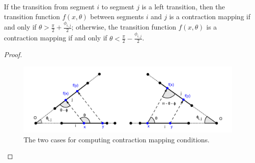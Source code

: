 \documentclass[]{styles/svproc}  %
\begin{document}
\begin{lemma} \label{lemma:angrange}
If the transition from segment $i$ to segment $j$ is a left transition, then the
transition function $f(x, \theta)$ between segments $i$ and $j$ is a contraction
mapping if and only if $\theta > \frac{\pi}{2}+\frac{\phi_{i, j}}{2}$;
otherwise, the transition function $f(x, \theta)$ is a contraction mapping if
and only if $\theta < \frac{\pi}{2}-\frac{\phi_{i, j}}{2}$.
\end{lemma}
\begin{proof}

\begin{figure}
    \includegraphics[width=1\linewidth]{figures/contraction_map_cond.png}
    \centering
    \caption{The two cases for computing contraction mapping conditions. \label{fig:cont_map}}
    \centering
\end{figure}


\end{proof}
\end{document}
